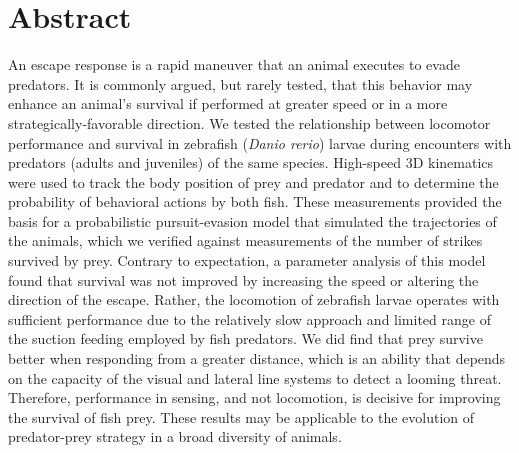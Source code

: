 \documentclass[]{rsos}%
\begin{document}
\section*{Abstract}
An escape response is a rapid maneuver that an animal executes to evade predators. 
It is commonly argued, but rarely tested, that this behavior may enhance an animal's survival if performed at greater speed or in a more strategically-favorable direction.
We tested the relationship between locomotor performance and survival in zebrafish (\textit{Danio rerio}) larvae during encounters with predators (adults and juveniles) of the same species.
High-speed 3D kinematics were used to track the body position of prey and predator and to determine the probability of behavioral actions by both fish.
These measurements provided the basis for a probabilistic pursuit-evasion model that simulated the trajectories of the animals, which we verified against measurements of the number of strikes survived by prey.
Contrary to expectation, a parameter analysis of this model found that survival was not improved by increasing the speed or altering the direction of the escape.
Rather, the locomotion of zebrafish larvae operates with sufficient performance due to the relatively slow approach and limited range of the suction feeding employed by fish predators.
We did find that prey survive better when responding from a greater distance, which is an ability that depends on the capacity of the visual and lateral line systems to detect a looming threat.
Therefore, performance in sensing, and not locomotion, is decisive for improving the survival of fish prey.
These results may be applicable to the evolution of predator-prey strategy in a broad diversity of animals.
\end{document}
